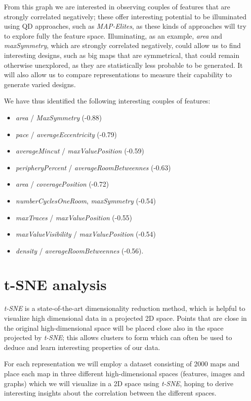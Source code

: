 From this graph we are interested in observing couples of features that are strongly correlated negatively; these offer interesting potential to be illuminated using QD approaches, such as \textit{MAP-Elites}, as these kinds of approaches will try to explore fully the feature space. Illuminating, as an example, \textit{area} and \textit{maxSymmetry}, which are strongly correlated negatively, could allow us to find interesting designs, such as big maps that are symmetrical, that could remain otherwise unexplored, as they are statistically less probable to be generated. It will also allow us to compare representations to measure their capability to generate varied designs. 

We have thus identified the following interesting couples of features: 
\begin{itemize}
    \item \textit{area} / \textit{MaxSymmetry} (-0.88) 
    \item \textit{pace} / \textit{averageEccentricity} (-0.79) 
    \item \textit{averageMincut} / \textit{maxValuePosition} (-0.59)
    \item \textit{peripheryPercent} / \textit{averageRoomBetweennes} (-0.63)
    \item \textit{area} / \textit{coveragePosition} (-0.72)
    \item \textit{numberCyclesOneRoom}, \textit{maxSymmetry} (-0.54)
    \item \textit{maxTraces} / \textit{maxValuePosition} (-0.55) 
    \item \textit{maxValueVisibility} / \textit{maxValuePosition} (-0.54) 
    \item \textit{density} / \textit{averageRoomBetweennes} (-0.56).
\end{itemize}


\section{t-SNE analysis}
\label{sec:tsne_analysis}

\textit{t-SNE} is a state-of-the-art dimensionality reduction method, which is helpful to visualize high dimensional data in a projected 2D space. Points that are close in the original high-dimensional space will be placed close also in the space projected by \textit{t-SNE}; this allows clusters to form which can often be used to deduce and learn interesting properties of our data. 

For each representation we will employ a dataset consisting of 2000 maps and place each map in three different high-dimensional spaces (features, images and graphs) which we will visualize in a 2D space using \textit{t-SNE}, hoping to derive interesting insights about the correlation between the different spaces.


